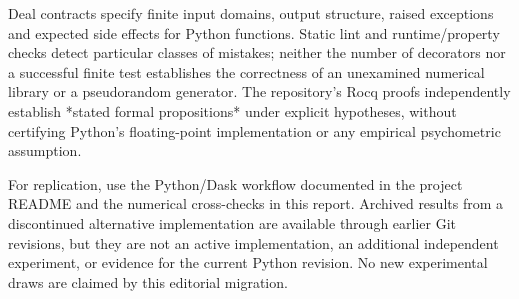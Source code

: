 Deal contracts specify finite input domains, output structure, raised
exceptions and expected side effects for Python functions. Static lint and
runtime/property checks detect particular classes of mistakes; neither the
number of decorators nor a successful finite test establishes the
correctness of an unexamined numerical library or a pseudorandom generator.
The repository's Rocq proofs independently establish *stated formal
propositions* under explicit hypotheses, without certifying Python's
floating-point implementation or any empirical psychometric assumption.

For replication, use the Python/Dask workflow documented in the project
README and the numerical cross-checks in this report. Archived results
from a discontinued alternative implementation are available through
earlier Git revisions, but they are not an active implementation, an
additional independent experiment, or evidence for the current Python
revision. No new experimental draws are claimed by this editorial migration.

\clearpage





\clearpage



\ProjectReportAIAppendix

